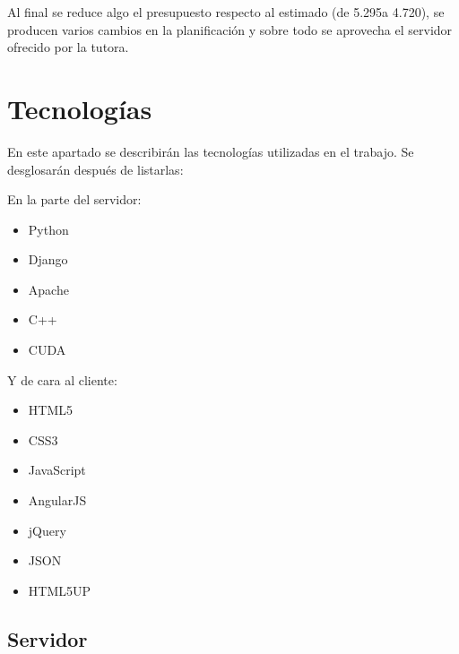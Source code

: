 Al final se reduce algo el presupuesto respecto al estimado (de 5.295\officialeuro a 4.720\officialeuro), se producen varios cambios en la planificación y sobre todo se aprovecha el servidor ofrecido por la tutora.

\newpage
\section{Tecnologías}

En este apartado se describirán las tecnologías utilizadas en el trabajo. Se desglosarán después de listarlas:

\bigskip
En la parte del servidor:
\begin{itemize}
	\item Python
	\item Django
	\item Apache
	\item C++
	\item CUDA
\end{itemize}

Y de cara al cliente:
\begin{itemize}
	\item HTML5
	\item CSS3
	\item JavaScript
	\item AngularJS
	\item jQuery
	\item JSON
	\item HTML5UP
\end{itemize}

\bigskip
\subsection{Servidor}
\bigskip

